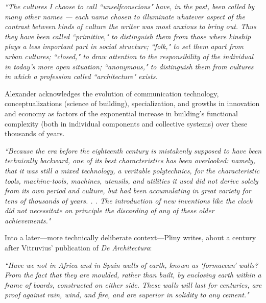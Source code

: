 \begin{flushright}
\small{
\textit{
``The cultures I choose to call ``unselfconscious" have, in the past, been called by many other names --- each name chosen to illuminate whatever aspect of the contrast between kinds of culture the writer was most anxious to bring out. Thus they have been called ``primitive," to distinguish them from those where kinship plays a less important part in social structure; ``folk," to set them apart from urban cultures; ``closed," to draw attention to the responsibility of the individual in today's more open situation; ``anonymous," to distinguish them from cultures in which a profession called ``architecture" exists.}} \cite[p33]{SYNOFFORM}
\end{flushright}

Alexander acknowledges the evolution of communication technology, conceptualizations (science of building), specialization, and growths in innovation and economy \cite[p33,34]{SYNOFFORM} as factors of the exponential increase in building's functional complexity (both in individual components and collective systems) over these thousands of years.



\begin{flushright}
\small{
\textit{
``Because the era before the eighteenth century is mistakenly supposed to have been technically backward, one of its best characteristics has been overlooked: namely, that it was still a mixed technology, a veritable polytechnics, for the characteristic tools, machine-tools, machines, utensils, and utilities it used did not derive solely from its own period and culture, but had been accumulating in great variety for tens of thousands of years. . . The introduction of new inventions like the clock did not necessitate on principle the discarding of any of these older achievements." \cite[p.134]{PENTAGON}}}
\end{flushright}

\clearpage

Into a later---more technically deliberate context---Pliny writes, about a century after Vitruvius' publication of \textit{De Architectura}:

\begin{flushright}
\small{
\textit{``Have we not in Africa and in Spain walls of earth, known as `formacean' walls? From the fact that they are moulded, rather than built, by enclosing earth within a frame of boards, constructed on either side. These walls will last for centuries, are proof against rain, wind, and fire, and are superior in solidity to any cement."}} \cite[p385]{NATHISTORY}
\end{flushright}


